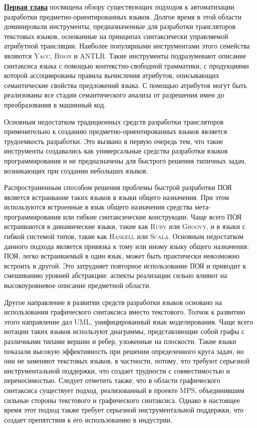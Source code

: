 \documentclass[12pt,a4paper]{article}
\newcommand{\tool}[1]{\textsc{#1}}
\theoremstyle{definition}
\theoremstyle{plain}
\newcommand{\afsubsection}[1]{\par \textbf{\underline{#1}}}
\begin{document}
\afsubsection{Первая глава} посвящена обзору существующих подходов к автоматизации разработки предметно-ориентированных языков. Долгое время в этой области доминировали инструменты, предназначенные для разработки трансляторов текстовых языков, основанные на принципах синтаксически управляемой атрибутной трансляции. Наиболее популярными инструментами этого семейства являются \tool{Yacc}, \tool{Bison} и \tool{ANTLR}. Такие инструменты подразумевают описание синтаксиса языка с помощью контекстно-свободной грамматики, с продукциями которой ассоциированы правила вычисления атрибутов, описывающих семантические свойства предложений языка. С помощью атрибутов могут быть реализованы все стадии семантического анализа от разрешения имен до преобразования в машинный код. 

Основным недостатком традиционных средств разработки трансляторов применительно к созданию предметно-ориентированных языков является трудоемкость разработки. Это вызвано в первую очередь тем, что такие инструменты создавались как универсальные средства разработки языков программирования и не предназначены для быстрого решения типичных задач, возникающих при создании небольших языков.

Распространенным способом решения проблемы быстрой разработки ПОЯ является встраивание таких языков в языки общего назначения. При этом используются встроенные в язык общего назначения средства мета-программирования или гибкие синтаксические конструкции. Чаще всего ПОЯ встраиваются в динамические языки, такие как \tool{Ruby} или \tool{Groovy}, и в языки с гибкой системой типов, такие как \tool{Haskell} или \tool{Scala}. Основным недостатком данного подхода является привязка к тому или иному языку общего назначения: ПОЯ, легко встраиваемый в один язык, может быть практически невозможно встроить в другой. Это затрудняет повторное использование ПОЯ и приводит к смешиванию уровней абстракции: аспекты реализации сильно влияют на высокоуровневое описание предметной области.

Другое направление в развитии средств разработки языков основано на использовании графического синтаксиса вместо текстового. Толчок к развитию этого направление дал UML, унифицированный язык моделирования. Чаще всего нотации таких языков используют диаграммы, представляющие собой графы с различными типами вершин и ребер, уложенные на плоскости. Такие языки показали высокую эффективность при решении определенного круга задач, но они не заменяют текстовых языков, в частности, потому, что требуют серьезной инструментальной поддержки, что создает трудности с совместимостью и переносимостью. Следует отметить также, что в области графического синтаксиса существует подход, реализованный в проекте \tool{MPS}, объединившим сильные стороны текстового и графического синтаксиса. Однако в настоящее время этот подход также требует серьезной инструментальной поддержки, что создает препятствия к его использованию в индустрии.
\end{document}
